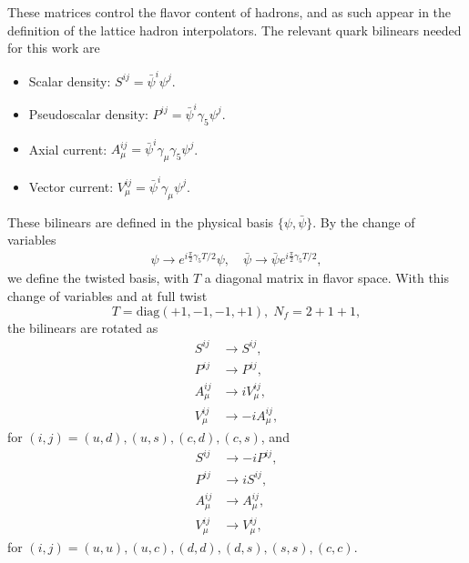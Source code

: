 These matrices control the flavor content of hadrons, and as such appear in the definition of the lattice hadron interpolators. The relevant quark bilinears needed for this work are
\begin{itemize}
\item Scalar density: $S^{ij}=\bar{\psi}^i\psi^j$.
\item Pseudoscalar density: $P^{ij}=\bar{\psi}^i\gamma_5\psi^j$.
\item Axial current: $A_{\mu}^{ij}=\bar{\psi}^i\gamma_{\mu}\gamma_5\psi^j$.
\item Vector current: $V_{\mu}^{ij}=\bar{\psi}^i\gamma_{\mu}\psi^j$.
\end{itemize}
These bilinears are defined in the physical basis $\{\psi,\bar{\psi}\}$. By the change of variables
\begin{gather}
\psi\rightarrow e^{i\frac{\pi}{2}\gamma_5T/2}\psi, \quad \bar{\psi}\rightarrow\bar{\psi}e^{i\frac{\pi}{2}\gamma_5T/2},
\end{gather}
we define the twisted basis, with $T$ a diagonal matrix in flavor space. With this change of variables and at full twist
\begin{equation}
T=\textrm{diag}(+1,-1,-1,+1),\;N_f=2+1+1,
\end{equation}
the bilinears are rotated as 
\begin{align}
S^{ij}&\rightarrow S^{ij}, \\
P^{ij}&\rightarrow P^{ij}, \\
A_{\mu}^{ij}&\rightarrow iV_{\mu}^{ij}, \\
V_{\mu}^{ij}&\rightarrow -iA_{\mu}^{ij},
\end{align}
for $(i,j)=(u,d),(u,s),(c,d),(c,s)$, and
\begin{align}
S^{ij}&\rightarrow -iP^{ij}, \\
P^{ij}&\rightarrow iS^{ij}, \\
A_{\mu}^{ij}&\rightarrow A_{\mu}^{ij}, \\
V_{\mu}^{ij}&\rightarrow V_{\mu}^{ij},
\end{align}
for $(i,j)=(u,u),(u,c),(d,d),(d,s),(s,s),(c,c)$.


